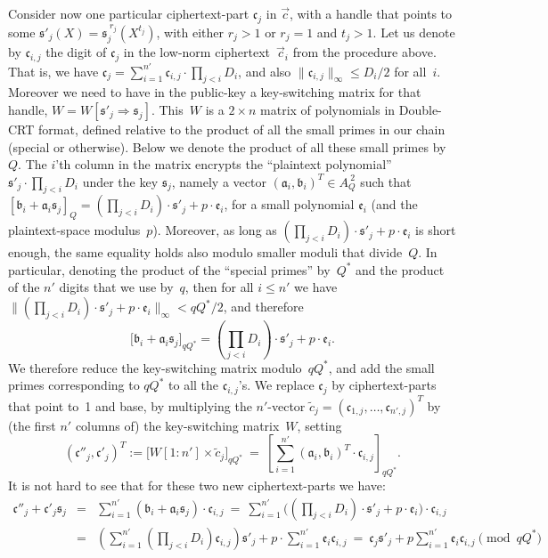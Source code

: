 \documentclass[14pt]{extarticle}
\def\vc{\vec{c}}
\newcommand{\mfa}{\mathfrak{a}}
\newcommand{\mfb}{\mathfrak{b}}
\newcommand{\ee}{\mathfrak{e}}
\newcommand{\ct}{\mathfrak{c}}
\newcommand{\sk}{\mathfrak{s}}
\begin{document}
Consider now one particular ciphertext-part $\ct_j$ in $\vc$, with a
handle that points to some $\sk'_j(X)=\sk_j^{\;r_j}(X^{t_j})$, with
either $r_j>1$ or $r_j=1$ and $t_j>1$. Let us denote by $\ct_{i,j}$
the digit of $\ct_j$ in the low-norm ciphertext~$\vc_i$ from the
procedure above. That is, we have
$\ct_j=\sum_{i=1}^{n'}\ct_{i,j} \cdot\prod_{j<i}D_i$, and also
$\|\ct_{i,j}\|_{\infty}\le D_i/2$ for all~$i$. 
%
Moreover we need to have in the public-key a key-switching matrix
for that handle, $W=W[\sk'_j \Rightarrow \sk_j]$. This~$W$ is a $2
\times n$ matrix of polynomials in Double-CRT format, defined relative
to the product of all the small primes in our chain (special or
otherwise). Below we denote the product of all these small primes
by~$Q$. The $i$'th column in the matrix encrypts the ``plaintext
polynomial'' $\sk'_j\cdot\prod_{j<i}D_i$ under the key $\sk_j$,
namely a vector $(\mfa_i,\mfb_i)^T\in A_Q^{~2}$ such that
$[\mfb_i+\mfa_i\sk_j]_Q=(\prod_{j<i}D_i)\cdot\sk'_j+ p\cdot\ee_i$,
for a small polynomial $\ee_i$ (and the plaintext-space modulus~$p$).
Moreover, as long as $(\prod_{j<i}D_i)\cdot\sk'_j+p\cdot\ee_i$ is
short enough, the same equality holds also modulo smaller moduli that
divide~$Q$. In particular, denoting the product of the ``special
primes'' by~$Q^*$ and the product of the $n'$ digits that we use
by~$q$, then for all $i\le n'$ we have $\|(\prod_{j<i}D_i)\cdot\sk'_j
+p\cdot\ee_i\|_{\infty}<qQ^*/2$, and therefore
\[
\big[\mfb_i+\mfa_i\sk_j\big]_{qQ^*}=(\prod_{j<i}D_i)
\cdot\sk'_j + p\cdot\ee_i.
\]
We therefore reduce the key-switching matrix modulo~$qQ^*$, and add
the small primes corresponding to $qQ^*$ to all the $\ct_{i,j}$'s.
We replace $\ct_j$ by ciphertext-parts that point to~1 and base, by
multiplying the $n'$-vector $\tilde{c}_j=(\ct_{1,j},\ldots,\ct_{n',j})^T$
by (the first $n'$ columns of) the key-switching matrix~$W$, setting
\[
(\ct''_j,\ct'_j)^T := \big[W[1:n'] \times \tilde{c}_j\big]_{qQ^*}
~=~ [\sum_{i=1}^{n'} (\mfa_i,\mfb_i)^T \cdot \ct_{i,j}]_{qQ^*}.
\]
It is not hard to see that for these two new ciphertext-parts we
have:
\begin{eqnarray*}
\ct''_j+\ct'_j\sk_j 
&=& \sum_{i=1}^{n'} (\mfb_i+\mfa_i\sk_j) \cdot \ct_{i,j}
~=~ \sum_{i=1}^{n'} \big((\prod_{j<i}D_i)\cdot\sk'_j
                    + p\cdot\ee_i\big)\cdot \ct_{i,j}\\
&=& \left(\sum_{i=1}^{n'}(\prod_{j<i}D_i)\ct_{i,j}\right)\sk'_j
    + p \cdot \sum_{i=1}^{n'} \ee_i\ct_{i,j}
~=~ \ct_j \sk'_j + p\sum_{i=1}^{n'} \ee_i\ct_{i,j} \pmod{qQ^*}
\end{eqnarray*}
\end{document}
